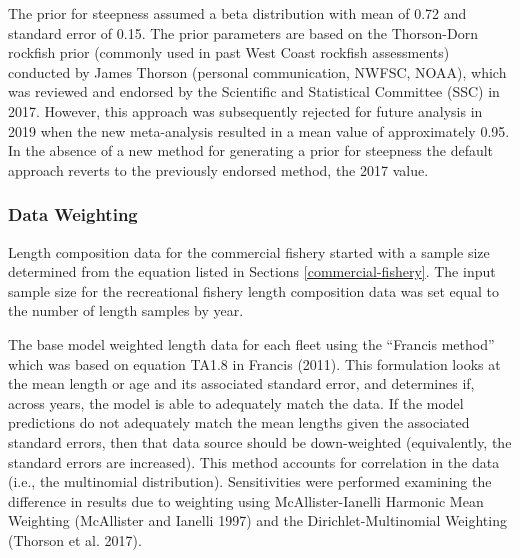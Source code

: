 \documentclass[11pt,
  english,
  a4paper,
]{article}
\begin{document}
The prior for steepness assumed a beta distribution with mean of 0.72 and standard error of 0.15. The prior parameters are based on the Thorson-Dorn rockfish prior (commonly used in past West Coast rockfish assessments) conducted by James Thorson (personal communication, NWFSC, NOAA), which was reviewed and endorsed by the Scientific and Statistical Committee (SSC) in 2017. However, this approach was subsequently rejected for future analysis in 2019 when the new meta-analysis resulted in a mean value of approximately 0.95. In the absence of a new method for generating a prior for steepness the default approach reverts to the previously endorsed method, the 2017 value.

\leavevmode\tagmcend\tagstructend\par


\hypertarget{data-weighting}{%
\subsubsection{Data Weighting}\label{data-weighting}}

\leavevmode\tagmcend\tagstructend


Length composition data for the commercial fishery started with a sample size determined from the equation listed in Sections \ref{commercial-fishery}. The input sample size for the recreational fishery length composition data was set equal to the number of length samples by year.

\leavevmode\tagmcend\tagstructend\par


The base model weighted length data for each fleet using the ``Francis method'' which was based on equation TA1.8 in Francis {(2011)\leavevmode\tagmcend\tagstructend}. This formulation looks at the mean length or age and its associated standard error, and determines if, across years, the model is able to adequately match the data. If the model predictions do not adequately match the mean lengths given the associated standard errors, then that data source should be down-weighted (equivalently, the standard errors are increased). This method accounts for correlation in the data (i.e., the multinomial distribution). Sensitivities were performed examining the difference in results due to weighting using McAllister-Ianelli Harmonic Mean Weighting {(McAllister and Ianelli 1997)\leavevmode\tagmcend\tagstructend} and the Dirichlet-Multinomial Weighting {(Thorson et al. 2017)\leavevmode\tagmcend\tagstructend}.
\end{document}
